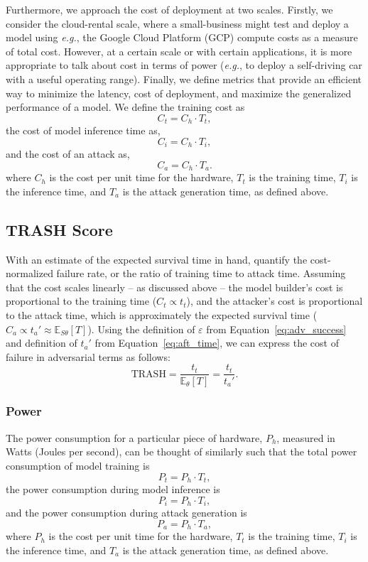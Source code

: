 \documentclass[sn-mathphys-num]{sn-jnl}%
\begin{document}
Furthermore, we approach the cost of deployment at two scales. Firstly, we consider the cloud-rental scale, where a small-business might test and deploy a model using \textit{e.g.}, the Google Cloud Platform (GCP) compute costs as a measure of total cost. However, at a certain scale or with certain applications, it is  more appropriate to talk about cost in terms of power (\textit{e.g.}, to deploy a self-driving car with a useful operating range). Finally, we define metrics that provide an efficient way to minimize the latency, cost of deployment, and
maximize the generalized performance of a model. We define the training cost as
\[
    C_t = C_h \cdot T_t,
\]
the cost of model inference time as,
\[
    C_i = C_h \cdot T_i,
\]
and the cost of an attack as,
\[
    C_a = C_h \cdot T_a.
\]
where $C_h$ is the cost per unit time for the hardware, $T_t$ is the training time, $T_i$ is the inference time, and $T_a$ is the attack generation time, as defined above.

\subsection{TRASH Score}
With an estimate of the expected survival time in hand,  quantify the cost-normalized failure rate, or the ratio of training time to attack time. Assuming that the cost scales linearly -- as discussed above -- the model builder's cost is proportional to the training time ($C_t \propto t_{t}$), and the attacker's cost is proportional to the attack time, which is approximately the expected survival time ($C_{a} \propto t_{a}' \approx \mathbb{E}_{S\theta}[T]$). Using the definition of $\varepsilon$ from Equation~\ref{eq:adv_success} and definition of $t_a'$ from Equation~\ref{eq:aft_time}, we can express the cost of failure in adversarial terms as follows:
\begin{equation}
	\textrm{TRASH}=\frac{t_t}{\mathbb{E}_{\theta}[T]} = \frac{t_t}{t_a'}.
	\label{eq:cost}
\end{equation}

\subsubsection{Power}

The power consumption for a particular piece of hardware, $P_h$, measured in Watts (Joules per second), can be thought of similarly such that the total power consumption of model training is
\[
    P_t = P_h \cdot T_t,
    \label{eq:power_training}
\]
the power consumption during model inference is
\[
    P_i = P_h \cdot T_i,
    \label{eq:power_inference}
\]
and the power consumption during attack generation is
\[
    P_a = P_h \cdot T_a,
    \label{eq:power_attack}
\]
where $P_h$ is the cost per unit time for the hardware, $T_t$ is the training time, $T_i$ is the inference time, and $T_a$ is the attack generation time, as defined above.
\end{document}
